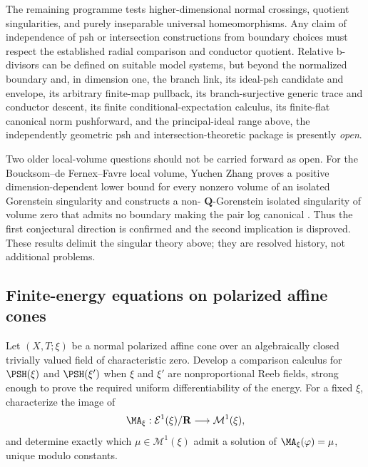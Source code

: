 The remaining programme tests higher-dimensional normal crossings, quotient
singularities, and purely inseparable universal homeomorphisms.  Any claim of
independence of psh or intersection constructions from boundary choices
must respect the established radial comparison and conductor quotient.
Relative b-divisors can be defined on suitable model systems, but beyond
the normalized boundary and, in dimension one, the branch link, its ideal-psh candidate and envelope,
its arbitrary finite-map pullback, its branch-surjective generic trace and
conductor descent, its finite conditional-expectation calculus, its
finite-flat canonical norm pushforward, and the
principal-ideal range above, the independently
geometric psh and intersection-theoretic package is
presently \emph{open}.

Two older local-volume questions should not be carried forward as open.
For the Boucksom--de Fernex--Favre local volume, Yuchen Zhang proves a
positive dimension-dependent lower bound for every nonzero volume of an
isolated Gorenstein singularity and constructs a non-
\(\mathbf Q\)-Gorenstein isolated singularity of volume zero that admits no
boundary making the pair log canonical
\cite{Zhang14LocalVolume}.  Thus the first conjectural
direction is confirmed and the second implication is disproved.  These
results delimit the singular theory above; they are resolved history, not
additional problems.

\subsection{Finite-energy equations on polarized affine cones}
\label{sec:ch72-affine-cones}

\begin{problem}\label{prob:frontier-affine-cone-ma}
Let \((X,T;\xi)\) be a normal polarized affine cone over an algebraically
closed trivially valued field of characteristic zero.  Develop a comparison
calculus for \(\PSH(\xi)\) and \(\PSH(\xi')\) when \(\xi\) and \(\xi'\) are
nonproportional Reeb fields, strong enough to prove the required uniform
differentiability of the energy.  For a fixed \(\xi\), characterize the image
of
\[
 \MA_\xi:\mathcal E^1(\xi)/\mathbf R
 \longrightarrow \mathcal M^1(\xi),
\]
and determine exactly which \(\mu\in\mathcal M^1(\xi)\) admit a solution of
\(\MA_\xi(\varphi)=\mu\), unique modulo constants.
\end{problem}


